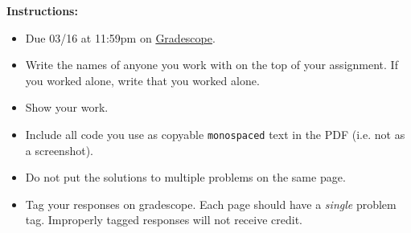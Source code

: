 \documentclass[12pt]{article}
\theoremstyle{definition}
\begin{document}
    \textbf{\Large{}}
    
    \vspace{-1.8em}
    \hrulefill
 
\textbf{Instructions:}
    \begin{itemize}
        \item Due 03/16 at 11:59pm on \href{https://www.gradescope.com/courses/487363/}{Gradescope}.
        \item Write the names of anyone you work with on the top of your assignment. If you worked alone, write that you worked alone.
        \item Show your work.
        \item Include all code you use as copyable \verb|monospaced| text in the PDF (i.e. not as a screenshot).
        \item Do not put the solutions to multiple problems on the same page.
        \item Tag your responses on gradescope. Each page should have a \emph{single} problem tag. Improperly tagged responses will not receive credit.
\end{itemize}
    
\vspace{2em}
\end{document}
